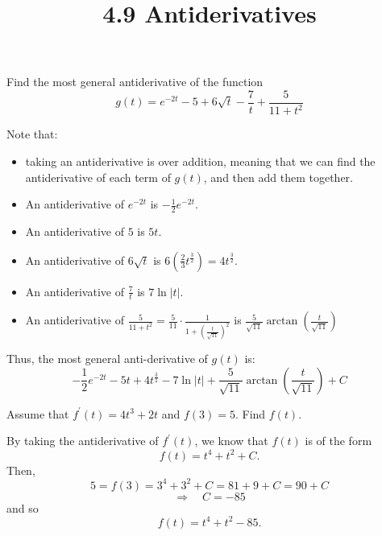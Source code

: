 \documentclass[nooutcomes,handout]{ximera}
\title{4.9 Antiderivatives}
\begin{document}
\begin{abstract}		\end{abstract}
\maketitle



\begin{problem}
Find the most general antiderivative of the function
$$ g(t) = e^{-2t} - 5 + 6\sqrt{t}-\frac{7}{t} + \frac{5}{11 + t^2} $$
		\begin{freeResponse}
		Note that:
			\begin{itemize}
			\item  taking an antiderivative is  over addition, meaning that we can find the antiderivative of each term of $g(t)$, and then add them together.
			\item  An antiderivative of $e^{-2t}$ is $-\frac{1}{2} e^{-2t}$.
			\item  An antiderivative of $5$ is $5t$.
			\item  An antiderivative of $6 \sqrt{t}$ is $6 \left( \frac{2}{3} t^{\frac{3}{2}} \right) = 4t^{\frac{3}{2}}$.
			\item  An antiderivative of $\frac{7}{t}$ is $7 \ln |t|$.
			\item  An antiderivative of $\frac{5}{11 + t^2} = \frac{5}{11} \cdot \frac{1}{1 + \left( \frac{t}{\sqrt{11}} \right)^2 }$
			is $\frac{5}{\sqrt{11}} \arctan \left( \frac{t}{\sqrt{11}} \right)$
			\end{itemize}
		Thus, the most general anti-derivative of $g(t)$ is:
		$$ -\frac{1}{2} e^{-2t} - 5t + 4t^{\frac{3}{2}} - 7 \ln |t| + \frac{5}{\sqrt{11}} \arctan \left( \frac{t}{\sqrt{11}} \right) + C $$
		\end{freeResponse}
		
		
\end{problem}








\begin{problem}
Assume that $f^\prime (t) = 4t^3 + 2t$ and $f(3) = 5$.  Find $f(t)$.
		\begin{freeResponse}
		By taking the antiderivative of $f^\prime (t)$, we know that $f(t)$ is of the form
		$$f(t) = t^4 + t^2 + C .$$
		Then,
		$$ 5 = f(3) = 3^4 + 3^2 + C = 81 + 9 + C = 90 + C$$
		$$\Longrightarrow \quad  C = -85 $$
		and so
		$$ f(t) = t^4 + t^2 - 85. $$
		\end{freeResponse}
		
		
		

\end{problem}
	
\end{document}
